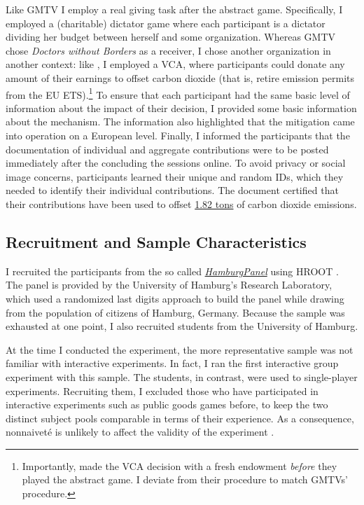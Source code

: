 \documentclass[
  authoryear,
  review,
  3p,
  onecolumn]{elsarticle}
\begin{document}
Like GMTV I employ a real giving task after the abstract game.
Specifically, I employed a (charitable) dictator game where each
participant is a dictator dividing her budget between herself and some
organization. Whereas GMTV chose \emph{Doctors without Borders} as a
receiver, I chose another organization in another context: like
\citet{GKLS2020}, I employed a VCA, where participants could donate any
amount of their earnings to offset carbon dioxide (that is, retire
emission permits from the EU ETS).\footnote{Importantly,
  \citet{GKLS2020} made the VCA decision with a fresh endowment
  \emph{before} they played the abstract game. I deviate from their
  procedure to match GMTVs' procedure.} To ensure that each participant
had the same basic level of information about the impact of their
decision, I provided some basic information about the mechanism. The
information also highlighted that the mitigation came into operation on
a European level. Finally, I informed the participants that the
documentation of individual and aggregate contributions were to be
posted immediately after the concluding the sessions online. To avoid
privacy or social image concerns, participants learned their unique and
random IDs, which they needed to identify their individual
contributions. The document certified that their contributions have been
used to offset
\href{https://www.compensators.org/compensatelist/?searchterm=stefan+traub}{1.82
tons} of carbon dioxide emissions.

\hypertarget{sec-sample}{%
\subsection{Recruitment and Sample Characteristics}\label{sec-sample}}

I recruited the participants from the so called
\emph{\href{https://www.wiso.uni-hamburg.de/forschung/forschungslabor/umfragelabor/aktuelle-umfragen/hamburgpanel.html}{HamburgPanel}}
using HROOT \citep{hroot}. The panel is provided by the University of
Hamburg's Research Laboratory, which used a randomized last digits
approach to build the panel while drawing from the population of
citizens of Hamburg, Germany. Because the sample was exhausted at one
point, I also recruited students from the University of Hamburg.

At the time I conducted the experiment, the more representative sample
was not familiar with interactive experiments. In fact, I ran the first
interactive group experiment with this sample. The students, in
contrast, were used to single-player experiments. Recruiting them, I
excluded those who have participated in interactive experiments such as
public goods games before, to keep the two distinct subject pools
comparable in terms of their experience. As a consequence, nonnaiveté is
unlikely to affect the validity of the experiment \citep[
p.~204]{GoodmanPaolacci2017}.
\end{document}
